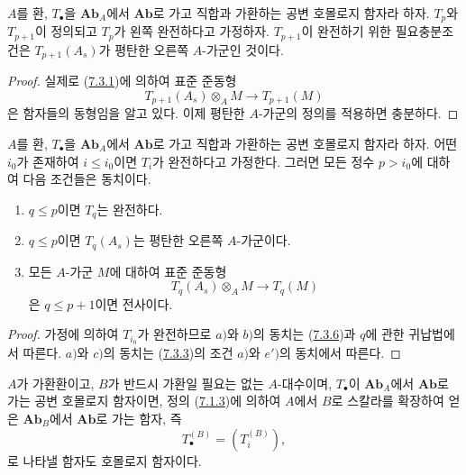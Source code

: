 \begin{lemma}[7.3.6]
\label{III.7.3.6-fr}
$A$를 환, $T_\bullet$을 $\mathbf{Ab}_A$에서 $\mathbf{Ab}$로 가고
직합과 가환하는 공변 호몰로지 함자라 하자. $T_p$와 $T_{p+1}$이
정의되고 $T_p$가 왼쪽 완전하다고 가정하자. $T_{p+1}$이 완전하기 위한
필요충분조건은 $T_{p+1}(A_s)$가 평탄한 오른쪽 $A$-가군인 것이다.
\end{lemma}

\begin{proof}
실제로 (\hyperref[III.7.3.1-fr]{7.3.1})에 의하여 표준 준동형
\[
  T_{p+1}(A_s)\otimes_A M\longrightarrow T_{p+1}(M)
\]
은 함자들의 동형임을 알고 있다. 이제 평탄한 $A$-가군의 정의를
적용하면 충분하다.
\end{proof}

\begin{proposition}[7.3.7]
\label{III.7.3.7-fr}
$A$를 환, $T_\bullet$을 $\mathbf{Ab}_A$에서 $\mathbf{Ab}$로 가고
직합과 가환하는 공변 호몰로지 함자라 하자. 어떤 $i_0$가 존재하여
$i\leq i_0$이면 $T_i$가 완전하다고 가정한다. 그러면 모든 정수
$p>i_0$에 대하여 다음 조건들은 동치이다.
\begin{enumerate}
  \item[a)] $q\leq p$이면 $T_q$는 완전하다.
  \item[b)] $q\leq p$이면 $T_q(A_s)$는 평탄한 오른쪽 $A$-가군이다.
  \item[c)] 모든 $A$-가군 $M$에 대하여 표준 준동형
    \[
      T_q(A_s)\otimes_A M\longrightarrow T_q(M)
    \]
    은 $q\leq p+1$이면 전사이다.
\end{enumerate}
\end{proposition}

\begin{proof}
가정에 의하여 $T_{i_0}$가 완전하므로 $a)$와 $b)$의 동치는
(\hyperref[III.7.3.6-fr]{7.3.6})과 $q$에 관한 귀납법에서 따른다.
$a)$와 $c)$의 동치는 (\hyperref[III.7.3.3-fr]{7.3.3})의 조건 $a)$와
$e')$의 동치에서 따른다.
\end{proof}


\begin{env}[7.3.8]
\label{III.7.3.8-fr}
$A$가 가환환이고, $B$가 반드시 가환일 필요는 없는 $A$-대수이며,
$T_\bullet$이 $\mathbf{Ab}_A$에서 $\mathbf{Ab}$로 가는 공변 호몰로지
함자이면, 정의 (\hyperref[III.7.1.3-fr]{7.1.3})에 의하여 $A$에서
$B$로 스칼라를 확장하여 얻은 $\mathbf{Ab}_B$에서 $\mathbf{Ab}$로 가는
함자, 즉
\[
  T_\bullet^{(B)}=(T_i^{(B)}),
\]
로 나타낼 함자도 호몰로지 함자이다.
\end{env}

